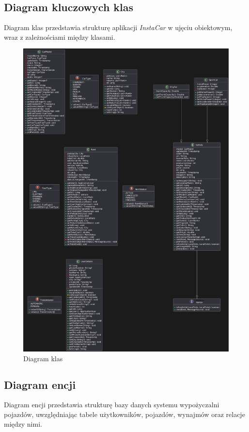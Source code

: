 \documentclass[12pt]{article}
\begin{document}
\subsection{Diagram kluczowych klas}
	Diagram klas przedstawia strukturę aplikacji \textit{InstaCar} w ujęciu obiektowym, wraz z zależnościami między klasami.
	
	\begin{figure}[H]
		\centering
		\includegraphics[width=1\linewidth, height=0.84\textheight]{diagramKlas}
		\caption{Diagram klas}
		\label{fig:diagramklas}
	\end{figure}
	
	\newpage
	\subsection{Diagram encji}
	Diagram encji przedstawia strukturę bazy danych systemu wypożyczalni pojazdów, uwzględniając tabele użytkowników, pojazdów, wynajmów oraz relacje między nimi.
	
\end{document}
